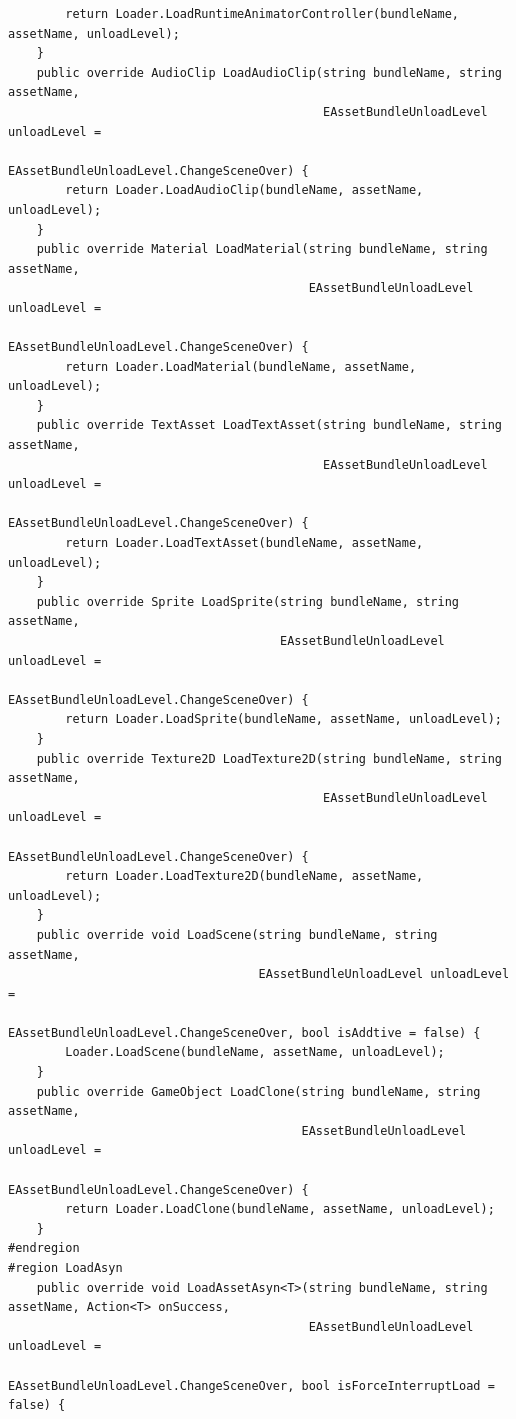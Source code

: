 \documentclass[9pt, b5paper]{article}
\begin{document}
\begin{verbatim}
        return Loader.LoadRuntimeAnimatorController(bundleName, assetName, unloadLevel);
    }
    public override AudioClip LoadAudioClip(string bundleName, string assetName, 
                                            EAssetBundleUnloadLevel unloadLevel = 
                                            EAssetBundleUnloadLevel.ChangeSceneOver) {
        return Loader.LoadAudioClip(bundleName, assetName, unloadLevel);
    }
    public override Material LoadMaterial(string bundleName, string assetName, 
                                          EAssetBundleUnloadLevel unloadLevel = 
                                          EAssetBundleUnloadLevel.ChangeSceneOver) {
        return Loader.LoadMaterial(bundleName, assetName, unloadLevel);
    }
    public override TextAsset LoadTextAsset(string bundleName, string assetName, 
                                            EAssetBundleUnloadLevel unloadLevel = 
                                            EAssetBundleUnloadLevel.ChangeSceneOver) {
        return Loader.LoadTextAsset(bundleName, assetName, unloadLevel);
    }
    public override Sprite LoadSprite(string bundleName, string assetName, 
                                      EAssetBundleUnloadLevel unloadLevel = 
                                      EAssetBundleUnloadLevel.ChangeSceneOver) {
        return Loader.LoadSprite(bundleName, assetName, unloadLevel);
    }
    public override Texture2D LoadTexture2D(string bundleName, string assetName, 
                                            EAssetBundleUnloadLevel unloadLevel = 
                                            EAssetBundleUnloadLevel.ChangeSceneOver) {
        return Loader.LoadTexture2D(bundleName, assetName, unloadLevel);
    }
    public override void LoadScene(string bundleName, string assetName, 
                                   EAssetBundleUnloadLevel unloadLevel = 
                                   EAssetBundleUnloadLevel.ChangeSceneOver, bool isAddtive = false) {
        Loader.LoadScene(bundleName, assetName, unloadLevel);
    }
    public override GameObject LoadClone(string bundleName, string assetName, 
                                         EAssetBundleUnloadLevel unloadLevel = 
                                         EAssetBundleUnloadLevel.ChangeSceneOver) {
        return Loader.LoadClone(bundleName, assetName, unloadLevel);
    }
#endregion
#region LoadAsyn
    public override void LoadAssetAsyn<T>(string bundleName, string assetName, Action<T> onSuccess, 
                                          EAssetBundleUnloadLevel unloadLevel = 
                                          EAssetBundleUnloadLevel.ChangeSceneOver, bool isForceInterruptLoad = false) {

\end{verbatim}
\end{document}
